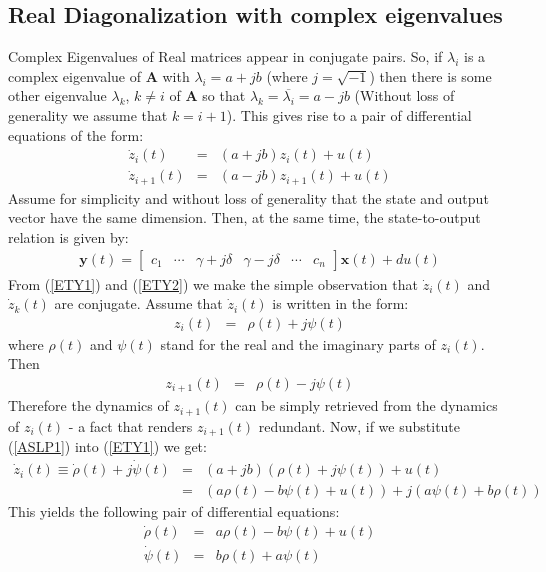 \documentclass[a4paper,10pt,oneside]{book}
\begin{document}
\subsection{Real Diagonalization with complex eigenvalues}
Complex Eigenvalues of Real matrices appear in conjugate pairs. So, if $\lambda_i$ is a complex eigenvalue of $\mathbf{A}$ with $\lambda_i=a+jb$ (where $j=\sqrt{-1}$) then there is some other eigenvalue $\lambda_k$, $k\neq i$ of $\mathbf{A}$ so that $\lambda_k=\overline{\lambda_i}=a-jb$ (Without loss of generality we assume that $k=i+1$). This gives rise to a pair of differential equations of the form:
\begin{eqnarray}
 \dot{z}_i(t)&=&(a+jb)z_i(t)+u(t)\label{ETY1}\\
 \dot{z}_{i+1}(t)&=&(a-jb)z_{i+1}(t)+u(t)\label{ETY2}
\end{eqnarray}
Assume for simplicity and without loss of generality that the state and output vector have the same dimension. Then, at the same time, the state-to-output relation is given by:
\begin{eqnarray}
 \mathbf{y}(t)=\left[ {\begin{array}{cccccc} c_1 & \cdots & \gamma+j\delta & \gamma-j\delta & \cdots & c_n \end{array} } \right] \mathbf{x}(t) + du(t)
\end{eqnarray}
From (\ref{ETY1}) and (\ref{ETY2}) we make the simple observation that $\dot{z}_i(t)$ and $\dot{z}_k(t)$ are conjugate. Assume that $\dot{z}_i(t)$ is written in the form:
\begin{eqnarray}
 z_i(t)&=&\rho(t) + j \psi(t)\label{ASLP1}
\end{eqnarray}
where $\rho(t)$ and $\psi(t)$ stand for the real and the imaginary parts of $z_i(t)$. Then
\begin{eqnarray}
 z_{i+1}(t)&=&\rho(t) - j \psi(t)
\end{eqnarray}
Therefore the dynamics of $z_{i+1}(t)$ can be simply retrieved from the dynamics of $z_i(t)$ - a fact that renders $z_{i+1}(t)$ redundant. Now, if we substitute (\ref{ASLP1}) into (\ref{ETY1}) we get:
\begin{eqnarray}
 \dot{z}_i(t) \equiv \dot{\rho}(t) + j \dot{\psi}(t) &=& (a+jb)(\rho(t) + j \psi(t))+u(t)\\
&=& (a\rho(t)-b\psi(t)+u(t)) + j(a\psi(t)+b\rho(t))
\end{eqnarray}
This yields the following pair of differential equations:
\begin{eqnarray}
 \dot{\rho}(t) &=& a\rho(t)-b\psi(t) + u(t) \\
 \dot{\psi}(t) &=& b\rho(t)+a\psi(t)
\end{eqnarray}
\end{document}
